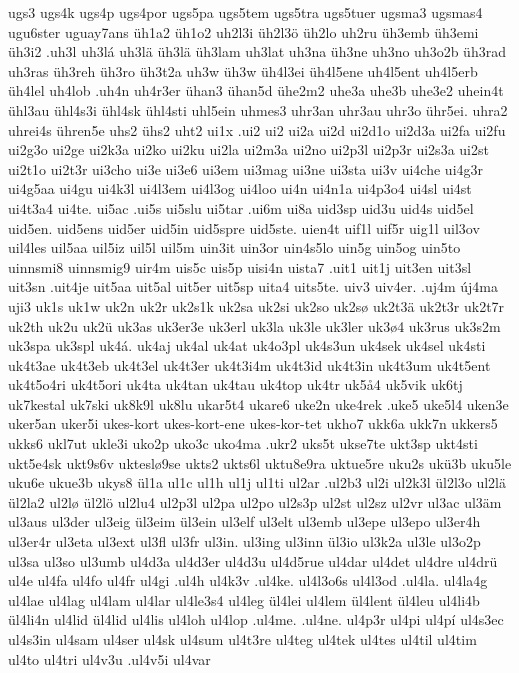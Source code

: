 {{ugs3
ugs4k
ugs4p
ugs4por
ugs5pa
ugs5tem
ugs5tra
ugs5tuer
ugsma3
ugsmas4
ugu6ster
uguay7ans
üh1a2
üh1o2
uh2l3i
üh2l3ö
üh2lo
uh2ru
üh3emb
üh3emi
üh3i2
.uh3l
uh3lá
uh3lä
üh3lä
üh3lam
uh3lat
uh3na
üh3ne
uh3no
uh3o2b
üh3rad
uh3ras
üh3reh
üh3ro
üh3t2a
uh3w
üh3w
üh4l3ei
üh4l5ene
uh4l5ent
uh4l5erb
üh4lel
uh4lob
.uh4n
uh4r3er
ühan3
ühan5d
ühe2m2
uhe3a
uhe3b
uhe3e2
uhein4t
ühl3au
ühl4s3i
ühl4sk
ühl4sti
uhl5ein
uhmes3
uhr3an
uhr3au
uhr3o
ühr5ei.
uhra2
uhrei4s
ühren5e
uhs2
ühs2
uht2
ui1x
.ui2
ui2
ui2a
ui2d
ui2d1o
ui2d3a
ui2fa
ui2fu
ui2g3o
ui2ge
ui2k3a
ui2ko
ui2ku
ui2la
ui2m3a
ui2no
ui2p3l
ui2p3r
ui2s3a
ui2st
ui2t1o
ui2t3r
ui3cho
ui3e
ui3e6
ui3em
ui3mag
ui3ne
ui3sta
ui3v
ui4che
ui4g3r
ui4g5aa
ui4gu
ui4k3l
ui4l3em
ui4l3og
ui4loo
ui4n
ui4n1a
ui4p3o4
ui4sl
ui4st
ui4t3a4
ui4te.
ui5ac
.ui5s
ui5slu
ui5tar
.ui6m
ui8a
uid3sp
uid3u
uid4s
uid5el
uid5en.
uid5ens
uid5er
uid5in
uid5spre
uid5ste.
uien4t
uif1l
uif5r
uig1l
uil3ov
uil4les
uil5aa
uil5iz
uil5l
uil5m
uin3it
uin3or
uin4s5lo
uin5g
uin5og
uin5to
uinnsmi8
uinnsmig9
uir4m
uis5c
uis5p
uisi4n
uista7
.uit1
uit1j
uit3en
uit3sl
uit3sn
.uit4je
uit5aa
uit5al
uit5er
uit5sp
uita4
uits5te.
uiv3
uiv4er.
.uj4m
új4ma
uji3
uk1s
uk1w
uk2n
uk2r
uk2s1k
uk2sa
uk2si
uk2so
uk2sø
uk2t3ä
uk2t3r
uk2t7r
uk2th
uk2u
uk2ü
uk3as
uk3er3e
uk3erl
uk3la
uk3le
uk3ler
uk3ø4
uk3rus
uk3s2m
uk3spa
uk3spl
uk4á.
uk4aj
uk4al
uk4at
uk4o3pl
uk4s3un
uk4sek
uk4sel
uk4sti
uk4t3ae
uk4t3eb
uk4t3el
uk4t3er
uk4t3i4m
uk4t3id
uk4t3in
uk4t3um
uk4t5ent
uk4t5o4ri
uk4t5ori
uk4ta
uk4tan
uk4tau
uk4top
uk4tr
uk5å4
uk5vik
uk6tj
uk7kestal
uk7ski
uk8k9l
uk8lu
ukar5t4
ukare6
uke2n
uke4rek
.uke5
uke5l4
uken3e
uker5an
uker5i
ukes-kort
ukes-kort-ene
ukes-kor-tet
ukho7
ukk6a
ukk7n
ukkers5
ukks6
ukl7ut
ukle3i
uko2p
uko3c
uko4ma
.ukr2
uks5t
ukse7te
ukt3sp
ukt4sti
ukt5e4sk
ukt9s6v
ukteslø9se
ukts2
ukts6l
uktu8e9ra
uktue5re
uku2s
ukü3b
uku5le
uku6e
ukue3b
ukys8
ül1a
ul1c
ul1h
ul1j
ul1ti
ul2ar
.ul2b3
ul2i
ul2k3l
ül2l3o
ul2lä
ül2la2
ul2lø
ül2lö
ul2lu4
ul2p3l
ul2pa
ul2po
ul2s3p
ul2st
ul2sz
ul2vr
ul3ac
ul3äm
ul3aus
ul3der
ul3eig
ül3eim
ül3ein
ul3elf
ul3elt
ul3emb
ul3epe
ul3epo
ul3er4h
ul3er4r
ul3eta
ul3ext
ul3fl
ul3fr
ul3in.
ul3ing
ul3inn
ül3io
ul3k2a
ul3le
ul3o2p
ul3sa
ul3so
ul3umb
ul4d3a
ul4d3er
ul4d3u
ul4d5rue
ul4dar
ul4det
ul4dre
ul4drü
ul4e
ul4fa
ul4fo
ul4fr
ul4gi
.ul4h
ul4k3v
.ul4ke.
ul4l3o6s
ul4l3od
.ul4la.
ul4la4g
ul4lae
ul4lag
ul4lam
ul4lar
ul4le3s4
ul4leg
ül4lei
ul4lem
ül4lent
ül4leu
ul4li4b
ül4li4n
ul4lid
ül4lid
ul4lis
ul4loh
ul4lop
.ul4me.
.ul4ne.
ul4p3r
ul4pi
ul4pí
ul4s3ec
ul4s3in
ul4sam
ul4ser
ul4sk
ul4sum
ul4t3re
ul4teg
ul4tek
ul4tes
ul4til
ul4tim
ul4to
ul4tri
ul4v3u
.ul4v5i
ul4var
}}
